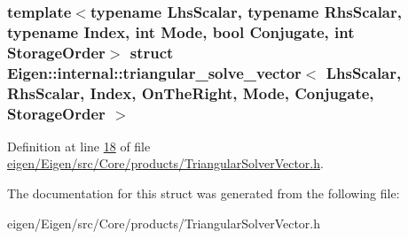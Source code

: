 \subsubsection*{template$<$typename Lhs\+Scalar, typename Rhs\+Scalar, typename Index, int Mode, bool Conjugate, int Storage\+Order$>$\newline
struct Eigen\+::internal\+::triangular\+\_\+solve\+\_\+vector$<$ Lhs\+Scalar, Rhs\+Scalar, Index, On\+The\+Right, Mode, Conjugate, Storage\+Order $>$}



Definition at line \hyperlink{eigen_2_eigen_2src_2_core_2products_2_triangular_solver_vector_8h_source_l00018}{18} of file \hyperlink{eigen_2_eigen_2src_2_core_2products_2_triangular_solver_vector_8h_source}{eigen/\+Eigen/src/\+Core/products/\+Triangular\+Solver\+Vector.\+h}.



The documentation for this struct was generated from the following file\+:\begin{DoxyCompactItemize}
\item 
eigen/\+Eigen/src/\+Core/products/\+Triangular\+Solver\+Vector.\+h\end{DoxyCompactItemize}
